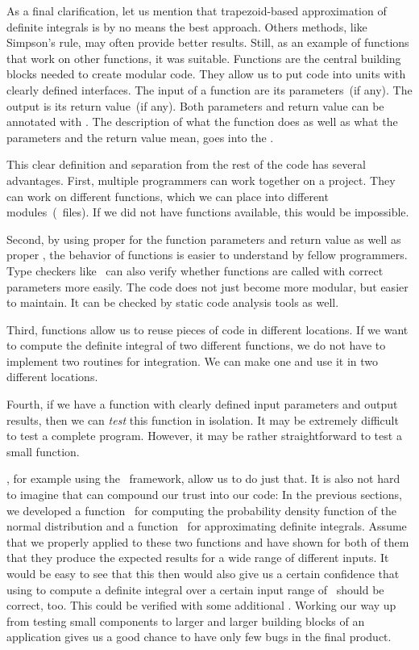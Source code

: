 As a final clarification, let us mention that trapezoid-based approximation of definite integrals is by no means the best approach.
Others methods, like Simpson's rule, may often provide better results.
Still, as an example of functions that work on other functions, it was suitable.%
\FloatBarrier%
\endhsection%
%
%
Functions are the central building blocks needed to create modular code.
They allow us to put code into units with clearly defined interfaces.
The input of a function are its parameters~(if any).
The output is its return value~(if any).
Both parameters and return value can be annotated with .
The description of what the function does as well as what the parameters and the return value mean, goes into the .

This clear definition and separation from the rest of the code has several advantages.
First, multiple programmers can work together on a project.
They can work on different functions, which we can place into different modules~(\python\ files).
If we did not have functions available, this would be impossible.

Second, by using proper  for the function parameters and return value as well as proper , the behavior of functions is easier to understand by fellow programmers.
Type checkers like \mypy\ can also verify whether functions are called with correct parameters more easily.
The code does not just become more modular, but easier to maintain.
It can be checked by static code analysis tools as well.

Third, functions allow us to reuse pieces of code in different locations.
If we want to compute the definite integral of two different functions, we do not have to implement two routines for integration.
We can make one and use it in two different locations.

Fourth, if we have a function with clearly defined input parameters and output results, then we can \emph{test} this function in isolation.
It may be extremely difficult to test a complete program.
However, it may be rather straightforward to test a small function.

, for example using the \pytest\ framework, allow us to do just that.
It is also not hard to imagine that  can compound our trust into our code:
In the previous sections, we developed a function~ for computing the probability density function of the normal distribution and a function~ for approximating definite integrals.
Assume that we properly applied  to these two functions and have shown for both of them that they produce the expected results for a wide range of different inputs.
It would be easy to see that this then would also give us a certain confidence that using  to compute a definite integral over a certain input range of~ should be correct, too.
This could be verified with some additional .
Working our way up from testing small components to larger and larger building blocks of an application gives us a good chance to have only few bugs in the final product.

